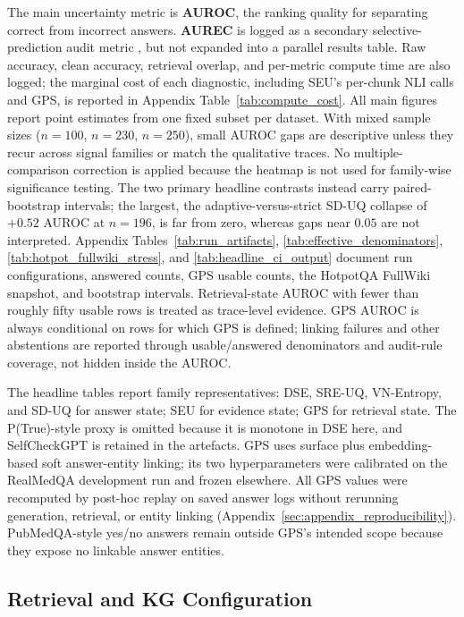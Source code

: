 The main uncertainty metric is \textbf{AUROC}, the ranking quality for
separating correct from incorrect answers.
\textbf{AUREC} is logged as a secondary selective-prediction audit metric
\citep{geifman2017selective}, but not expanded into a parallel results table.
Raw accuracy, clean accuracy, retrieval overlap, and per-metric compute time
are also logged; the marginal cost of each diagnostic, including SEU's
per-chunk NLI calls and GPS, is reported in
Appendix Table~\ref{tab:compute_cost}.
All main figures report point estimates from one fixed subset per dataset.
With mixed sample sizes ($n=100$, $n=230$, $n=250$), small AUROC gaps are
descriptive unless they recur across signal families or match the qualitative
traces.
No multiple-comparison correction is applied because the heatmap is not used
for family-wise significance testing.
The two primary headline contrasts instead carry paired-bootstrap intervals;
the largest, the adaptive-versus-strict SD-UQ collapse of $+0.52$ AUROC at
$n=196$, is far from zero, whereas gaps near $0.05$ are not interpreted.
Appendix Tables~\ref{tab:run_artifacts}, \ref{tab:effective_denominators},
\ref{tab:hotpot_fullwiki_stress}, and \ref{tab:headline_ci_output} document
run configurations, answered counts, GPS usable counts, the HotpotQA FullWiki
snapshot, and bootstrap intervals.
Retrieval-state AUROC with fewer than roughly fifty usable rows is treated as
trace-level evidence.
GPS AUROC is always conditional on rows for which GPS is defined; linking
failures and other abstentions are reported through usable/answered
denominators and audit-rule coverage, not hidden inside the AUROC.

The headline tables report family representatives: DSE, SRE-UQ, VN-Entropy,
and SD-UQ for answer state; SEU for evidence state; GPS for retrieval state.
The P(True)-style proxy is omitted because it is monotone in DSE here, and
SelfCheckGPT is retained in the artefacts.
GPS uses surface plus embedding-based soft answer-entity linking; its two
hyperparameters were calibrated on the RealMedQA development run and frozen
elsewhere.
All GPS values were recomputed by post-hoc replay on saved answer logs without
rerunning generation, retrieval, or entity linking
(Appendix~\ref{sec:appendix_reproducibility}).
PubMedQA-style yes/no answers remain outside GPS's intended scope because they
expose no linkable answer entities.

\subsection{Retrieval and KG Configuration}

